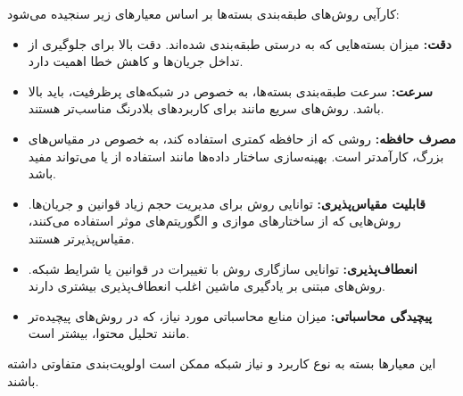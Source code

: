 \begin{enumerate}
\begin{qsolve}
		کارآیی روش‌های طبقه‌بندی بسته‌ها بر اساس معیارهای زیر سنجیده می‌شود:
		\begin{itemize}
			\item \textbf{دقت:} میزان بسته‌هایی که به درستی طبقه‌بندی شده‌اند. دقت بالا برای جلوگیری از تداخل جریان‌ها و کاهش خطا اهمیت دارد.
			\item \textbf{سرعت:} سرعت طبقه‌بندی بسته‌ها، به خصوص در شبکه‌های پرظرفیت، باید بالا باشد. روش‌های سریع مانند  برای کاربردهای بلادرنگ مناسب‌تر هستند.
			\item \textbf{مصرف حافظه:} روشی که از حافظه کمتری استفاده کند، به خصوص در مقیاس‌های بزرگ، کارآمدتر است. بهینه‌سازی ساختار داده‌ها مانند استفاده از  یا  می‌تواند مفید باشد.
			\item \textbf{قابلیت مقیاس‌پذیری:} توانایی روش برای مدیریت حجم زیاد قوانین و جریان‌ها. روش‌هایی که از ساختارهای موازی و الگوریتم‌های موثر استفاده می‌کنند، مقیاس‌پذیرتر هستند.
			\item \textbf{انعطاف‌پذیری:} توانایی سازگاری روش با تغییرات در قوانین یا شرایط شبکه. روش‌های مبتنی بر یادگیری ماشین اغلب انعطاف‌پذیری بیشتری دارند.
			\item \textbf{پیچیدگی محاسباتی:} میزان منابع محاسباتی مورد نیاز، که در روش‌های پیچیده‌تر مانند تحلیل محتوا، بیشتر است.
		\end{itemize}
		
		این معیارها بسته به نوع کاربرد و نیاز شبکه ممکن است اولویت‌بندی متفاوتی داشته باشند.
		
	\end{qsolve}
\end{enumerate}





